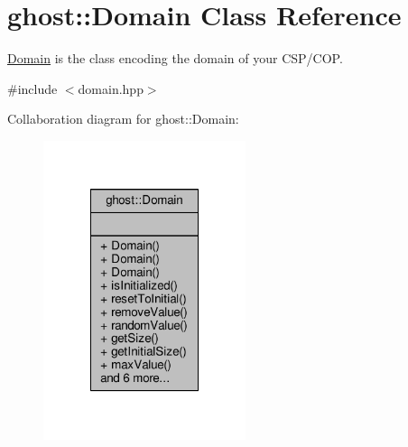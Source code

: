 \hypertarget{classghost_1_1Domain}{\section{ghost\-:\-:Domain Class Reference}
\label{classghost_1_1Domain}
}


\hyperlink{classghost_1_1Domain}{Domain} is the class encoding the domain of your C\-S\-P/\-C\-O\-P.  




{\ttfamily \#include $<$domain.\-hpp$>$}



Collaboration diagram for ghost\-:\-:Domain\-:\nopagebreak
\begin{figure}[H]
\begin{center}
\leavevmode
\includegraphics[width=168pt]{classghost_1_1Domain__coll__graph}
\end{center}
\end{figure}
